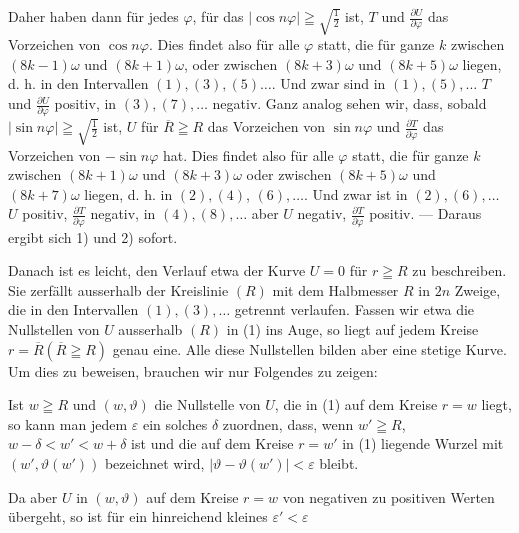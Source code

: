 \noindent Daher haben dann für jedes \(\varphi\), für das \(|\cos n\varphi|\geqq\sqrt{\tfrac12}\) ist, \(T\) und \(\frac{\partial U}{\partial\varphi}\) das Vorzeichen
von \(\cos n\varphi\). Dies findet also für alle \(\varphi\) statt, die für ganze \(k\) zwischen
\((8k-1)\omega\) und \((8k+1)\omega\), oder zwischen \((8k+3)\omega\) und \((8k+5)\omega\) liegen, d. h.
in den Intervallen \((1),(3),(5)\ldots\). Und zwar sind in \((1),(5),\ldots\) \(T\) und \(\frac{\partial U}{\partial\varphi}\) positiv,
in \((3),(7),\ldots\) negativ. Ganz analog sehen wir, dass, sobald \(|\sin n\varphi|\geqq\sqrt{\tfrac12}\) ist,
\(U\) für \(\overline R\geqq R\) das Vorzeichen von \(\sin n\varphi\) und \(\frac{\partial T}{\partial\varphi}\) das Vorzeichen von \(-\sin n\varphi\)
hat. Dies findet also für alle \(\varphi\) statt, die für ganze \(k\) zwischen \((8k+1)\omega\)
und \((8k+3)\omega\) oder zwischen \((8k+5)\omega\) und \((8k+7)\omega\) liegen, d. h. in \((2),(4)\),
\((6),\ldots\). Und zwar ist in \((2),(6),\ldots\) \(U\) positiv, \(\frac{\partial T}{\partial\varphi}\) negativ, in \((4),(8),\ldots\)
aber \(U\) negativ, \(\frac{\partial T}{\partial\varphi}\) positiv. — Daraus ergibt sich 1) und 2) sofort.
\par\clearpage{}
\HistoricalFoot{}{2\textsuperscript{*}}
 Danach ist es
leicht, den Verlauf etwa der Kurve \(U=0\) für \(r\geqq R\) zu beschreiben. Sie
zerfällt ausserhalb der Kreislinie \((R)\) mit dem Halbmesser \(R\) in \(2n\) Zweige, die
in den Intervallen \((1),(3),\ldots\) getrennt verlaufen. Fassen wir etwa die
Nullstellen von \(U\) ausserhalb \((R)\) in (1) ins Auge, so liegt auf jedem Kreise
\(r=\overline R(\overline R\geqq R)\) genau eine. Alle diese Nullstellen bilden aber eine stetige
Kurve. Um dies zu beweisen, brauchen wir nur Folgendes zu zeigen:
\par
Ist \(w\geqq R\) und \((w,\vartheta)\) die Nullstelle von \(U\), die in (1) auf dem Kreise
\(r=w\) liegt, so kann man jedem \(\varepsilon\) ein solches \(\delta\) zuordnen, dass, wenn \(w'\geqq R\),
\(w-\delta<w'<w+\delta\) ist und die auf dem Kreise \(r=w'\) in (1) liegende Wurzel
mit \((w',\vartheta(w'))\) bezeichnet wird, \(|\vartheta-\vartheta(w')|<\varepsilon\) bleibt.
\par
Da aber \(U\) in \((w,\vartheta)\) auf dem Kreise \(r=w\) von negativen zu positiven
Werten übergeht, so ist für ein hinreichend kleines \(\varepsilon'<\varepsilon\)

